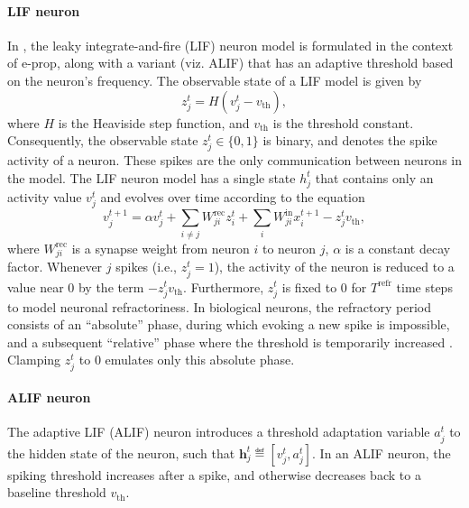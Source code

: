         \paragraph{LIF neuron}
            In \citet{bellec2020solution}, the leaky integrate-and-fire (LIF) neuron model is formulated in the context of e-prop, along with a variant (viz. ALIF) that has an adaptive threshold based on the neuron's frequency.
            The observable state of a LIF model is given by
            \begin{equation}
            z^t_j = H\left(v_j^t-v_\text{th}\right),
            \end{equation}
            where $H$ is the Heaviside step function, and $v_\text{th}$ is the threshold constant.
            Consequently, the observable state $z^t_j \in \{0, 1\}$ is binary, and denotes the spike activity of a neuron.
            These spikes are the only communication between neurons in the model.
            The LIF neuron model has a single state $h^t_j$ that contains only an activity value $v^t_j$ and evolves over time according to the equation
            \begin{equation}\label{eq:alifV}
            v^{t+1}_j = \alpha v_j^t + \sum_{i\neq j}W^\text{rec}_{ji}z_i^t + \sum_i W^\text{in}_{ji}x_i^{t+1} - z_j^tv_
            \text{th},
            \end{equation}
            where $W^\text{rec}_{ji}$ is a synapse weight from neuron $i$ to neuron $j$, $\alpha$ is a constant decay factor.
            Whenever $j$ spikes (i.e., $z_j^t = 1$), the activity of the neuron is reduced to a value near 0 by the term $-z^t_jv_\text{th}$.
            Furthermore, $z^t_j$ is fixed to 0 for $T^\text{refr}$ time steps to model neuronal refractoriness.
            In biological neurons, the refractory period consists of an ``absolute'' phase, during which evoking a new spike is impossible, and a subsequent ``relative'' phase where the threshold is temporarily increased \citep{purves2008neuroscience}.
            Clamping $z^t_j$ to 0 emulates only this absolute phase.


        \paragraph{ALIF neuron}
            The adaptive LIF (ALIF) neuron introduces a threshold adaptation variable $a^t_j$ to the hidden state of the neuron, such that $\mathbf{h}^t_j \eqdef \left[v^t_j, a^t_j\right]$.
            In an ALIF neuron, the spiking threshold increases after a spike, and otherwise decreases back to a baseline threshold $v_\text{th}$.

